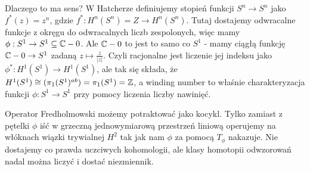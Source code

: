 \documentclass[12pt]{book}
\begin{document}
Dlaczego to ma sens? W Hatcherze definiujemy stopień funkcji $S^n\to S^n$ jako $f^*(z)=z^n$, gdzie $f^*:H^n(S^n)=Z\to H^n(S^n)$. Tutaj dostajemy odwracalne funkcje z okręgu do odwracalnych liczb zespolonych, więc mamy $\phi: S^1\to S^1\subseteq \mathbb{C}-0$. Ale $\mathbb{C}-0$ to jest to samo co $S^1$ - mamy ciągłą funkcję $\mathbb{C}-0\to S^1$ zadaną $z\mapsto \frac{z}{|z|}$. Czyli racjonalne jest liczenie jej indeksu jako $\phi^*:H^1(S^1)\to H^1(S^1)$, ale tak się składa, że $H^1(S^1)\cong(\pi_1(S^1)^{ab})=\pi_1(S^1)=\mathbb{Z}$, a winding number to właśnie charakteryzacja funkcji $\phi: S^1\to S^1$ przy pomocy liczenia liczby nawinięć.

Operator Fredholmowski możemy potraktować jako kocykl. Tylko zamiast z pętelki $\phi$ iść w grzeczną jednowymiarową przestrzeń liniową operujemy na włóknach wiązki trywialnej $H^2$ tak jak nam $\phi$ za pomocą $T_\phi$ nakazuje. Nie dostajemy co prawda uczciwych kohomologii, ale klasy homotopii odwzorowań nadal można liczyć i dostać niezmiennik.
\end{document}
